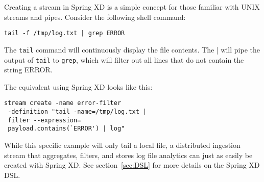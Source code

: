 Creating a stream in Spring XD is a simple concept for those familiar with
UNIX streams and pipes. Consider the following shell command:

\begin{lstlisting}
tail -f /tmp/log.txt | grep ERROR
\end{lstlisting}

The \texttt{tail} command will continuously display the file contents. The |
will pipe the output of \texttt{tail} to \texttt{grep}, which will filter 
out all lines that do not contain the string ERROR.

The equivalent using Spring XD looks like this:

\begin{lstlisting}
stream create -name error-filter
 -definition "tail -name=/tmp/log.txt |
 filter --expression=
 payload.contains(`ERROR') | log"
\end{lstlisting}

While this specific example will only tail a local file, a distributed 
ingestion stream that aggregates, filters, and stores log file analytics
can just as easily be created with Spring XD. See section~\ref{sec:DSL} for more
details on the Spring XD DSL.
